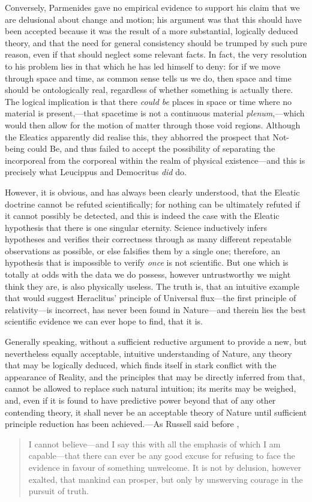 Conversely, Parmenides gave no empirical evidence to support his claim that we are delusional about change and motion; his argument was that this should have been accepted because it was the result of a more substantial, logically deduced theory, and that the need for general consistency should be trumped by such pure reason, even if that should neglect some relevant facts. In fact, the very resolution to his problem lies in that which he has led himself to deny: for if we move through space and time, as common sense tells us we do, then space and time should be ontologically real, regardless of whether something is actually there. The logical implication is that there \textit{could be} places in space or time where no material is present,---that spacetime is not a continuous material \textit{plenum},---which would then allow for the motion of matter through those void regions. Although the Eleatics apparently did realise this, they abhorred the prospect that Not-being could Be, and thus failed to accept the possibility of separating the incorporeal from the corporeal within the realm of physical existence---and this is precisely what Leucippus and Democritus \textit{did} do.

However, it is obvious, and has always been clearly understood, that the Eleatic doctrine cannot be refuted scientifically; for nothing can be ultimately refuted if it cannot possibly be detected, and this is indeed the case with the Eleatic hypothesis that there is one singular eternity. Science inductively infers hypotheses and verifies their correctness through as many different repeatable observations as possible, or else falsifies them by a single one; therefore, an hypothesis that is impossible to verify \textit{once} is not scientific. But one which is totally at odds with the data we do possess, however untrustworthy we might think they are, is also physically useless. The truth is, that an intuitive example that would suggest Heraclitus' principle of Universal flux---the first principle of relativity---is incorrect, has never been found in Nature---and therein lies the best scientific evidence we can ever hope to find, that it is. 

Generally speaking, without a sufficient reductive argument to provide a new, but nevertheless equally acceptable, intuitive understanding of Nature, any theory that may be logically deduced, which finds itself in stark conflict with the appearance of Reality, and the principles that may be directly inferred from that, cannot be allowed to replace such natural intuition; its merits may be weighed, and, even if it is found to have predictive power beyond that of any other contending theory, it shall never be an acceptable theory of Nature until sufficient principle reduction has been achieved.---As Russell said before \cite{Russell1961},
\begin{quote}
I cannot believe---and I say this with all the emphasis of which I am capable---that there can ever be any good excuse for refusing to face the evidence in favour of something unwelcome. It is not by delusion, however exalted, that mankind can prosper, but only by unswerving courage in the pursuit of truth.
\end{quote}

